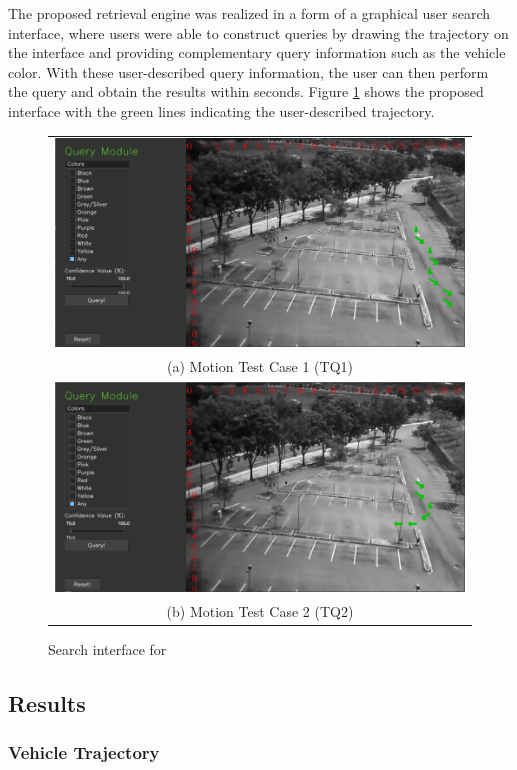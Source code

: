 The proposed retrieval engine was realized in a form of a graphical user search interface, where users were able to construct queries by drawing the trajectory on the interface and providing complementary query information such as the vehicle color. With these user-described query information, the user can then perform the query and obtain the results within seconds. Figure \ref{fig:versionOneInterface} shows the proposed interface with the green lines indicating the user-described trajectory.  



\begin{figure}[htb!]
	\centering
	\begin{tabular}{c}
		\includegraphics[width=0.7\linewidth]{image/retrievalOne/test1-8inputs.PNG} \\  
		(a) Motion Test Case 1 (TQ1) \\
		\includegraphics[width=0.7\linewidth]{image/retrievalOne/test2-6input.PNG}\\
		(b) Motion Test Case 2 (TQ2)
	\end{tabular}
	\caption{Search interface for \versionOne} 
	\label{fig:versionOneInterface}
\end{figure}



\subsection{Results}
\subsubsection{Vehicle Trajectory}
